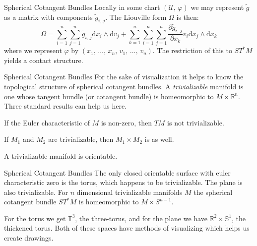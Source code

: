 \documentclass{beamer}
\begin{document}
    \begin{frame}{Spherical Cotangent Bundles}
        Locally in some chart $(\mathcal{U},\,\varphi)$ we may represent
        $\tilde{g}$ as a matrix with components $\tilde{g}_{i,\,j}$. The
        Liouville form $\Omega$ is then:
        \begin{equation}
            \Omega=\sum_{i=1}^{n}\sum_{j=1}^{n}
                \tilde{g}_{i,\,j}\textrm{d}x_{i}\land\textrm{d}v_{j}+
            \sum_{k=1}^{n}\sum_{i=1}^{n}\sum_{j=1}^{n}
                \frac{\partial\tilde{g}_{i,\,j}}{\partial{x}_{k}}
                v_{i}\textrm{d}x_{j}\land\textrm{d}x_{k}
        \end{equation}
        where we represent $\varphi$ by
        $(x_{1},\,\dots,\,x_{n},\,v_{1},\,\dots,\,v_{n})$. The restriction of
        this to $ST^{*}M$ yields a contact structure.
    \end{frame}
    \begin{frame}{Spherical Cotangent Bundles}
        For the sake of visualization it helps to know the topological
        structure of spherical cotangent bundles. A \textit{trivializable}
        manifold is one whose tangent bundle (or cotangent bundle) is
        homeomorphic to $M\times\mathbb{R}^{n}$.
        Three standard results can help us here.
        \begin{theorem}
            If the Euler characteristic of $M$ is non-zero, then $TM$ is not
            trivializable.
        \end{theorem}
        \begin{theorem}
            If $M_{1}$ and $M_{2}$ are trivializable, then
            $M_{1}\times{M}_{2}$ is as well.
        \end{theorem}
        \begin{theorem}
            A trivializable manifold is orientable.
        \end{theorem}
    \end{frame}
    \begin{frame}{Spherical Cotangent Bundles}
        The only closed orientable surface with euler characteristic zero is
        the torus, which happens to be trivializable. The plane is also
        trivializable. For $n$ dimensional trivializable manifolds $M$ the
        spherical cotangent bundle $ST^{*}M$ is homeomorphic to
        $M\times{S}^{n-1}$.
        \par\hfill\par
        For the torus we get $\mathbb{T}^{3}$, the
        three-torus, and for the plane we have
        $\mathbb{R}^{2}\times\mathbb{S}^{1}$, the thickened torus. Both of these
        spaces have methods of visualizing which helps us create drawings.
    \end{frame}
\end{document}
